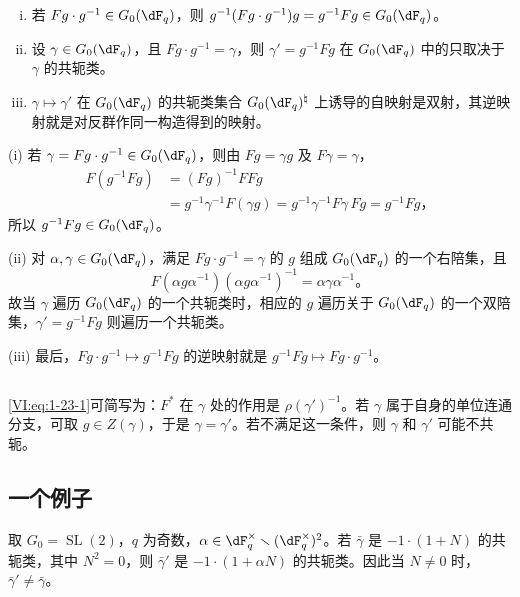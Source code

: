\begin{lemma_}\label{VI:1-24}
\begin{enumerate}[(i)]
\item 若 $Fg\cdot g^{-1}\in G_0(\dF_q)$，则 $g^{-1}(Fg\cdot g^{-1})g=g^{-1}Fg\in G_0(\dF_q)$。
\item 设 $\gamma\in G_0(\dF_q)$，且 $Fg\cdot g^{-1}=\gamma$，则 $\gamma'=g^{-1}Fg$ 在 $G_0(\dF_q)$ 中的只取决于 $\gamma$ 的共轭类。
\item $\gamma\mapsto\gamma'$ 在 $G_0(\dF_q)$ 的共轭类集合 $G_0(\dF_q)^\natural$ 上诱导的自映射是双射，其逆映射就是对反群作同一构造得到的映射。
\end{enumerate}
\end{lemma_}
(i) 若 $\gamma=Fg\cdot g^{-1}\in G_0(\dF_q)$，则由 $Fg=\gamma g$ 及 $F\gamma=\gamma$，
\[
\begin{aligned}
F(g^{-1}Fg)&=(Fg)^{-1}FFg\\
&=g^{-1}\gamma^{-1}F(\gamma g)
=g^{-1}\gamma^{-1}F\gamma\,Fg=g^{-1}Fg\text{，}
\end{aligned}
\]
所以 $g^{-1}Fg\in G_0(\dF_q)$。

(ii) 对 $\alpha,\gamma\in G_0(\dF_q)$，满足 $Fg\cdot g^{-1}=\gamma$ 的 $g$ 组成 $G_0(\dF_q)$ 的一个右陪集，且
\[
F(\alpha g\alpha^{-1})(\alpha g\alpha^{-1})^{-1}=\alpha\gamma\alpha^{-1}\text{。}
\]
故当 $\gamma$ 遍历 $G_0(\dF_q)$ 的一个共轭类时，相应的 $g$ 遍历关于 $G_0(\dF_q)$ 的一个双陪集，$\gamma'=g^{-1}Fg$ 则遍历一个共轭类。

(iii) 最后，$Fg\cdot g^{-1}\mapsto g^{-1}Fg$ 的逆映射就是 $g^{-1}Fg\mapsto Fg\cdot g^{-1}$。

\subsection{}\label{VI:1-25}
\eqref{VI:eq:1-23-1}可简写为：$F^\ast$ 在 $\gamma$ 处的作用是 $\rho(\gamma')^{-1}$。若 $\gamma$ 属于自身的单位连通分支，可取 $g\in Z(\gamma)$，于是 $\gamma=\gamma'$。若不满足这一条件，则 $\gamma$ 和 $\gamma'$ 可能不共轭。

\subsection{一个例子}\label{VI:1-26}
取 $G_0=\operatorname{SL}(2)$，$q$ 为奇数，$\alpha\in\dF_q^\times\setminus(\dF_q^\times)^2$。若 $\bar\gamma$ 是 $-1\cdot(1+N)$ 的共轭类，其中 $N^2=0$，则 $\bar\gamma'$ 是 $-1\cdot(1+\alpha N)$ 的共轭类。因此当 $N\ne0$ 时，$\bar\gamma'\ne\bar\gamma$。

